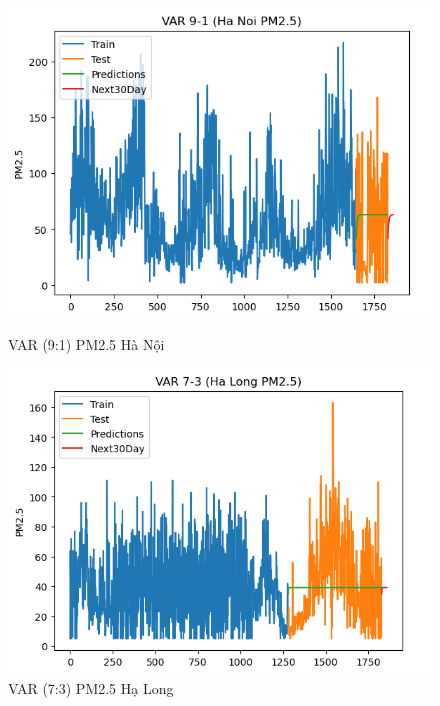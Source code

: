 \begin{figure}[h]
\begin{minipage}[b]{0.45\linewidth}
        \label{fig2}
    \end{minipage}
        \begin{minipage}[b]{0.45\linewidth}
        \centering
        \includegraphics[width=\linewidth]{img/VAR_9_1_HN.png}
        \caption{\scriptsize VAR (9:1) PM2.5 Hà Nội}
        \label{fig1}
    \end{minipage}\hfill
    \begin{minipage}[b]{0.45\linewidth}
        \centering
        \includegraphics[width=\linewidth]{img/VAR_7_3_HL.png}
        \caption{\scriptsize VAR (7:3) PM2.5 Hạ Long}
        \label{fig2}
    \end{minipage}
    \begin{minipage}[b]{0.45\linewidth}
        \centering

\end{minipage}
\end{figure}
